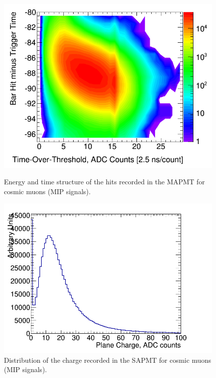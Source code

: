 \documentclass[a4paper,11pt]{article}
\begin{document}
\begin{figure}
 \centering
 \begin{minipage}[b]{.48\textwidth}
  \centering
  \includegraphics[width=.9\textwidth]{tot_vs_deltat_log_scale_2D.png}
  \caption{Energy and time structure of the hits recorded in the MAPMT for cosmic muons (MIP signals).}
  \label{fig:tot_vs_deltat}
 \end{minipage}
 \hfill
 \begin{minipage}[b]{.48\textwidth}
  \centering
  \includegraphics[width=\textwidth]{plane_charge_hist.png}
  \vspace{1mm}
  \caption{Distribution of the charge recorded in the SAPMT for cosmic muons (MIP signals).}
  \label{fig:plane_charge}
 \end{minipage}
\end{figure} 
\end{document}

